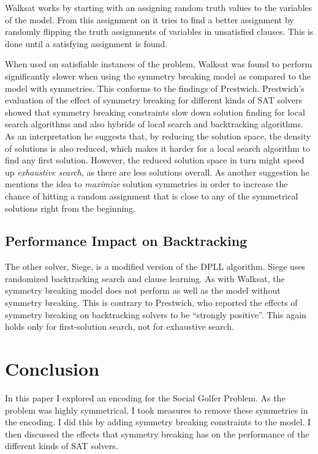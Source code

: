 \documentclass[a4paper]{scrartcl}
\begin{document}
Walksat works by starting with an assigning random truth values to the variables of the model. From this assignment on it tries to find a better assignment by randomly flipping the truth assignments of variables in unsatisfied clauses. This is done until a satisfying assignment is found.

When used on satisfiable instances of the problem, Walksat was found to perform significantly slower when using the symmetry breaking model as compared to the model with symmetries. This conforms to the findings of Prestwich\cite{Prestwich}. Prestwich's evaluation of the effect of symmetry breaking for different kinds of SAT solvers showed that symmetry breaking constraints slow down solution finding for local search algorithms and also hybrids of local search and backtracking algorithms. As an interpretation he suggests that, by reducing the solution space, the density of solutions is also reduced, which makes it harder for a local search algorithm to find any first solution. However, the reduced solution space in turn might speed up \emph{exhaustive search}, as there are less solutions overall. As another suggestion he mentions the idea to \emph{maximize} solution symmetries in order to increase the chance of hitting a random assignment that is close to any of the symmetrical solutions right from the beginning.


\subsection{Performance Impact on Backtracking}

The other solver, Siege, is a modified version of the DPLL algorithm\cite{DPLL}. Siege uses randomized backtracking search and clause learning. As with Walksat, the symmetry breaking model does not perform as well as the model without symmetry breaking. This is contrary to Prestwich, who reported the effects of symmetry breaking on backtracking solvers to be ``strongly positive''\cite{Prestwich}. This again holds only for first-solution search, not for exhaustive search.


\section{Conclusion}

In this paper I explored an encoding for the Social Golfer Problem. As the problem was highly symmetrical, I took measures to remove these symmetries in the encoding. I did this by adding symmetry breaking constraints to the model. I then discussed the effects that symmetry breaking has on the performance of the different kinds of SAT solvers.
\end{document}
